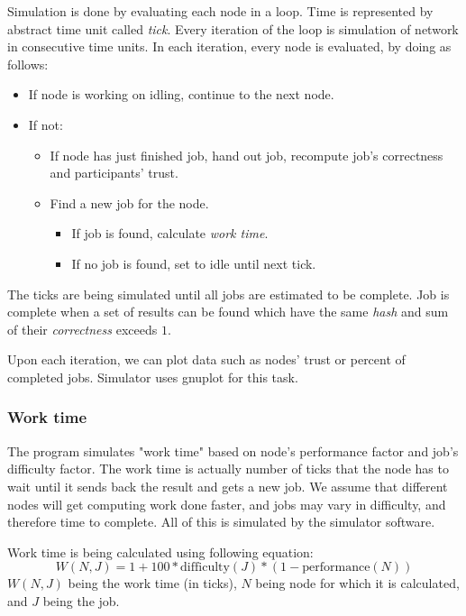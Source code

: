 Simulation is done by evaluating each node in a loop. Time is represented by abstract time unit called \emph{tick}. Every iteration of the loop is simulation of network in consecutive time units. In each iteration, every node is evaluated, by doing as follows:
\begin{itemize}
	\item If node is working on idling, continue to the next node.
	\item If not: \begin{itemize}
		\item If node has just finished job, hand out job, recompute job's correctness and participants' trust.
		\item Find a new job for the node. \begin{itemize}
			\item If job is found, calculate \emph{work time}.
			\item If no job is found, set to idle until next tick. 
		\end{itemize}
	\end{itemize}
\end{itemize}

The ticks are being simulated until all jobs are estimated to be complete. Job is complete when a set of results can be found which have the same \emph{hash} and sum of their \emph{correctness} exceeds $1$.

Upon each iteration, we can plot data such as nodes' trust or percent of completed jobs. Simulator uses gnuplot for this task.

\subsubsection{Work time}
\label{s:worktime}

The program simulates "work time" based on node's performance factor and job's difficulty factor. The work time is actually number of ticks that the node has to wait until it sends back the result and gets a new job. We assume that different nodes will get computing work done faster, and jobs may vary in difficulty, and therefore time to complete. All of this is simulated by the simulator software.

Work time is being calculated using following equation:
\begin{equation}
W(N, J) = 1 + 100 * \text{difficulty}(J) * (1 - \text{performance}(N))
\end{equation}
$W(N, J)$ being the work time (in ticks), $N$ being node for which it is calculated, and $J$ being the job.


